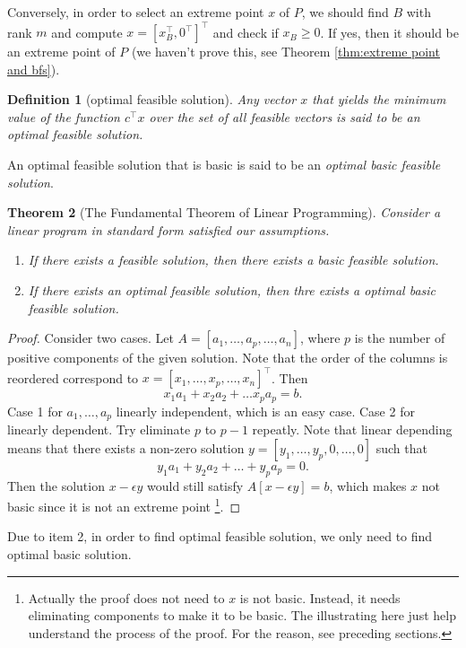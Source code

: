 \documentclass[12pt,a4paper]{report}
\numberwithin{equation}{section}
\theoremstyle{mystyle}
\newtheorem{definition}{Definition}[section]
\newtheorem{theorem}[definition]{Theorem}
\newcommand{\T}{\top}
\begin{document}
	Conversely, in order to select an extreme point $x$ of $P$, we should find $B$ with rank $m$ and compute $x=[x_B^\T,0^\T]^\T$ and check if $x_B\geq 0$. If yes, then it should be an extreme point of $P$ (we haven't prove this, see Theorem \ref{thm:extreme point and bfs}).
	
	\begin{definition}[optimal feasible solution]
		Any vector $x$ that yields the minimum value of the function $c^\T x$ over the set of all feasible vectors is said to be an \emph{optimal feasible solution}.
	\end{definition}
	An optimal feasible solution that is basic is said to be an \emph{optimal basic feasible solution}.
	
	\begin{theorem}[The Fundamental Theorem of Linear Programming]
		\label{thm:Fundamental Theorem of Linear Programming}
		Consider a linear program in standard form satisfied our assumptions.
		\begin{enumerate}
			\item If there exists a feasible solution, then there exists a basic feasible solution.
			\item If there exists an optimal feasible solution, then thre exists a optimal basic feasible solution.
		\end{enumerate}
	\end{theorem}
	\begin{proof}
		Consider two cases. Let $A=[a_1,\dots,a_p,\dots,a_n]$, where $p$ is the number of positive components of the given solution. Note that the order of the columns is reordered correspond to $x=[x_1,\dots,x_p,\dots,x_n]^\T$. Then 
		$$
		x_1a_1+x_2a_2+\dots x_pa_p=b.
		$$
		Case 1 for $a_1,\dots,a_p$ linearly independent, which is an easy case. Case 2 for linearly dependent. Try eliminate $p$ to $p-1$ repeatly. Note that linear depending means that there exists a non-zero solution $y=[y_1,\dots,y_p,0,\dots,0]$ such that
		$$
		y_1a_1+y_2a_2+\dots+y_pa_p=0.
		$$
		Then the solution $x-\epsilon y$ would still satisfy $A[x-\epsilon y]=b$, which makes $x$ not basic since it is not an extreme point
		\footnote{
		Actually the proof does not need to $x$ is not basic. Instead, it needs eliminating components to make it to be basic. The illustrating here just help understand the process of the proof. For the reason, see preceding sections.
		}.
	\end{proof}
	Due to item 2, in order to find optimal feasible solution, we only need to find optimal basic solution.
	
\end{document}
